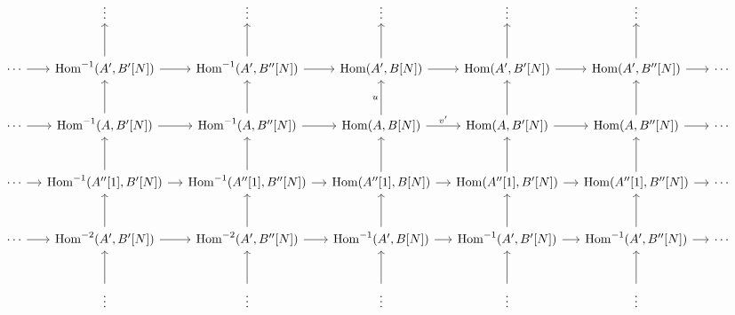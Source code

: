 \documentclass[deligne.tex]{subfiles}
\begin{document}
\newpage
{} %
\begin{landscape}\begin{small}\begin{ceqn}\begin{equation*}\begin{tikzcd}[row sep=large,column sep=small]
&\vdots&\vdots&\vdots&\vdots&\vdots \\
\cdots\arrow[r]
&\Hom^{-1}(A',B'[N])\arrow[r]\arrow[u]
&\Hom^{-1}(A',B''[N])\arrow[r]\arrow[u]
&\Hom(A',B[N])\arrow[r]\arrow[u]
&\Hom(A',B'[N])\arrow[r]\arrow[u]
&\Hom(A',B''[N])\arrow[r]\arrow[u]
&\cdots
\\
\cdots\arrow[r]
&\Hom^{-1}(A,B'[N])\arrow[r]\arrow[u]
&\Hom^{-1}(A,B''[N])\arrow[r]\arrow[u]
&\Hom(A,B[N])\arrow[r,"{v'}"]\arrow[u,"u"]
&\Hom(A,B'[N])\arrow[r]\arrow[u]
&\Hom(A,B''[N])\arrow[r]\arrow[u]
&\cdots
\\
\cdots\arrow[r]
&\Hom^{-1}(A''[1],B'[N])\arrow[r]\arrow[u]
&\Hom^{-1}(A''[1],B''[N])\arrow[r]\arrow[u]
&\Hom(A''[1],B[N])\arrow[r]\arrow[u]
&\Hom(A''[1],B'[N])\arrow[r]\arrow[u]
&\Hom(A''[1],B''[N])\arrow[r]\arrow[u]
&\cdots
\\
\cdots\arrow[r]
&\Hom^{-2}(A',B'[N])\arrow[r]\arrow[u]
&\Hom^{-2}(A',B''[N])\arrow[r]\arrow[u]
&\Hom^{-1}(A',B[N])\arrow[r]\arrow[u]
&\Hom^{-1}(A',B'[N])\arrow[r]\arrow[u]
&\Hom^{-1}(A',B''[N])\arrow[r]\arrow[u]
&\cdots \\
&\vdots\arrow[u]&\vdots\arrow[u]&\vdots\arrow[u]&\vdots\arrow[u]&\vdots\arrow[u] \\
\end{tikzcd}\end{equation*}\end{ceqn}\end{small}\end{landscape}
\restoregeometry
\end{document}
